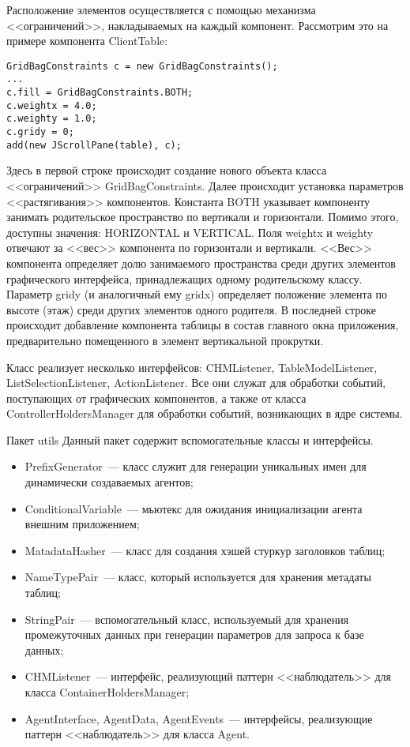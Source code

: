 Расположение элементов осуществляется с помощью механизма <<ограничений>>, накладываемых на каждый компонент. Рассмотрим это на примере компонента ClientTable:
\begin{lstlisting}
GridBagConstraints c = new GridBagConstraints();
...
c.fill = GridBagConstraints.BOTH;
c.weightx = 4.0;
c.weighty = 1.0;
c.gridy = 0;
add(new JScrollPane(table), c);
\end{lstlisting}
Здесь в первой строке происходит создание нового объекта класса <<ограничений>> GridBagConstraints. Далее происходит установка параметров <<растягивания>> компонентов. Константа BOTH указывает компоненту занимать родительское пространство по вертикали и горизонтали. Помимо этого, доступны значения: HORIZONTAL и VERTICAL. Поля weightx и weighty отвечают за <<вес>> компонента по горизонтали и вертикали. <<Вес>> компонента определяет долю занимаемого пространства среди других элементов графического интерфейса, принадлежащих одному родительскому классу. Параметр gridy (и аналогичный ему gridx) определяет положение элемента по высоте (этаж) среди других элементов одного родителя. В последней строке происходит добавление компонента таблицы в состав главного окна приложения, предварительно помещенного в элемент вертикальной прокрутки.

Класс реализует несколько интерфейсов: CHMListener, TableModelListener, ListSelectionListener, ActionListener. Все они служат для обработки событий, поступающих от графических компонентов, а также от класса ControllerHoldersManager для обработки событий, возникающих в ядре системы.

{Пакет utils}
Данный пакет содержит вспомогательные классы и интерфейсы.
\begin{itemize}
\item PrefixGenerator~--- класс служит для генерации уникальных имен для динамически создаваемых агентов;
\item ConditionalVariable~--- мьютекс для ожидания инициализации агента внешним приложением;
\item MatadataHasher~--- класс для создания хэшей стуркур заголовков таблиц;
\item NameTypePair~--- класс, который используется для хранения метадаты таблиц;
\item StringPair~--- вспомогательный класс, используемый для хранения промежуточных данных при генерации параметров для запроса к базе данных;
\item CHMListener~--- интерфейс, реализующий паттерн <<наблюдатель>> для класса ContainerHoldersManager;
\item AgentInterface, AgentData, AgentEvents~--- интерфейсы, реализующие паттерн <<наблюдатель>> для класса Agent.
\end{itemize}

